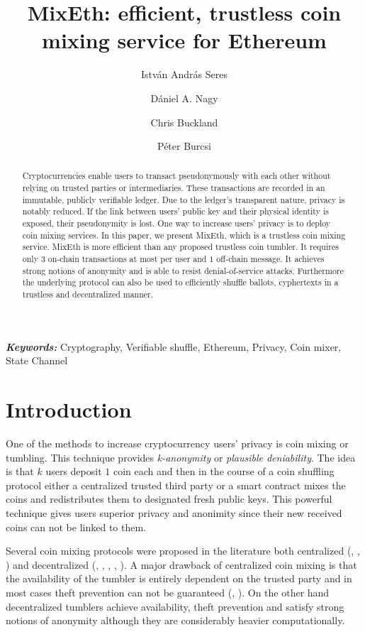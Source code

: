 \documentclass[a4paper]{article}
\title{MixEth: efficient, trustless coin mixing service for Ethereum}
\author[1]{István András Seres}
\author[1]{Dániel A. Nagy}
\author[2]{Chris Buckland}
\author[1]{Péter Burcsi}
\affil[1]{Department of Computer Algebra, Eötvös Loránd University}
\affil[2]{King's College London}
\theoremstyle{definition}
\providecommand{\keywords}[1]{\textbf{\textit{Keywords:}} #1}
\begin{document}
\maketitle

\begin{abstract}
Cryptocurrencies enable users to transact pseudonymously with each other without relying on trusted parties or intermediaries. These transactions are recorded in an immutable, publicly verifiable ledger. Due to the ledger's transparent nature, privacy is notably reduced. If the link between users' public key and their physical identity is exposed, their pseudonymity is lost. One way to increase users' privacy is to deploy coin mixing services. In this paper, we present MixEth, which is a trustless coin mixing service. MixEth is more efficient than any proposed trustless coin tumbler. It requires only $3$ on-chain transactions at most per user and $1$ off-chain message. It achieves strong notions of anonymity and is able to resist denial-of-service attacks. Furthermore the underlying protocol can also be used to efficiently shuffle ballots, cyphertexts in a trustless and decentralized manner.     
\end{abstract}
\keywords{Cryptography, Verifiable shuffle, Ethereum, Privacy, Coin mixer, State Channel}

\section{Introduction}
One of the methods to increase cryptocurrency users' privacy is coin mixing or tumbling. This technique provides \textit{k-anonymity} or \textit{plausible deniability}. The idea is that $k$ users deposit $1$ coin each and then in the course of a coin shuffling protocol either a centralized trusted third party or a smart contract mixes the coins and redistributes them to designated fresh public keys. This powerful technique gives users superior privacy and anonimity since their new received coins can not be linked to them.

Several coin mixing protocols were proposed in the literature both centralized (\cite{bonneau2014mixcoin}, \cite{valenta2015blindcoin}, \cite{heilman2017tumblebit}) and decentralized (\cite{maxwell2013coinjoin}, \cite{ruffing2014coinshuffle}, \cite{miximus2018}, \cite{meiklejohn2018mobius}, \cite{bissias2014sybil}). A major drawback of centralized coin mixing is that the availability of the tumbler is entirely dependent on the trusted party and in most cases theft prevention can not be guaranteed (\cite{bonneau2014mixcoin}, \cite{valenta2015blindcoin}). On the other hand decentralized tumblers achieve availability, theft prevention and satisfy strong notions of anonymity although they are considerably heavier computationally. 
\end{document}
